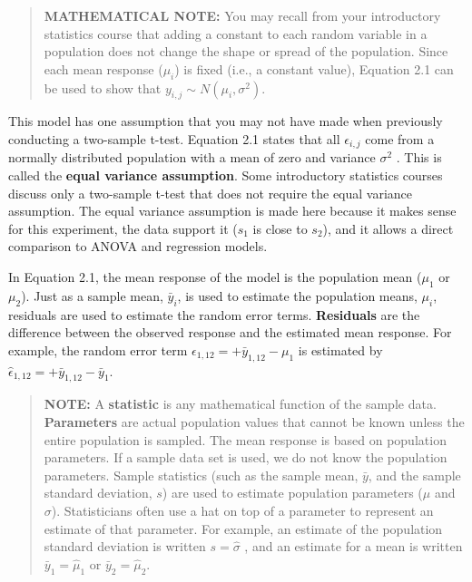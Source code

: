 \documentclass[
]{report}
\begin{document}
\begin{quote}
\textbf{MATHEMATICAL NOTE:}
You may recall from your introductory statistics course that adding a constant to each random variable in a population does not change the shape or spread of the population. Since each mean response (\(\scriptstyle \mu_i\)) is fixed (i.e., a constant value), Equation 2.1 can be used to show that \(\scriptstyle y_{i, j} \sim N(\mu_i,\sigma^2)\).
\end{quote}

This model has one assumption that you may not have made when previously conducting a two-sample t-test. Equation 2.1 states that all \(\scriptstyle \epsilon_{i, j}\) come from a normally distributed population with a mean of zero and
variance \(\scriptstyle \sigma^2\) . This is called the \textbf{equal variance assumption}. Some introductory statistics courses discuss only a two-sample t-test that does not require the equal variance assumption. The equal variance assumption is
made here because it makes sense for this experiment, the data support it (\(\scriptstyle s_1\) is close to \(\scriptstyle s_2\)), and it allows a direct comparison to ANOVA and regression models.

In Equation 2.1, the mean response of the model is the population mean (\(\scriptstyle \mu_1\) or \(\scriptstyle \mu_2\)). Just as a sample mean, \(\scriptstyle \bar{y}_i\), is used to estimate the population means, \(\scriptstyle \mu_i\), residuals are used to estimate the random error terms. \textbf{Residuals} are the difference between the observed response and the estimated mean response. For example, the random error term \(\scriptstyle \epsilon_{1, 12} = + \bar{y}_{1, 12} - \mu_1\) is estimated by \(\scriptstyle \hat{\epsilon}_{1, 12} = + \bar{y}_{1, 12} - \bar{y}_1\).

\begin{quote}
\textbf{NOTE:}
A \textbf{statistic} is any mathematical function of the sample data. \textbf{Parameters} are actual population values that cannot be known unless the entire population is sampled. The mean response is based on population parameters. If a sample data set is used, we do not know the population parameters. Sample statistics (such as the sample mean, \(\scriptstyle \bar{y}\), and the sample standard deviation, \(\scriptstyle s\)) are used to estimate population parameters (\(\scriptstyle \mu\) and \(\scriptstyle \sigma\)). Statisticians often use a hat on top of a parameter to represent an estimate of that parameter. For example, an estimate of the population standard deviation is written \(\scriptstyle s = \hat{\sigma}\) , and an estimate for a mean is written \(\scriptstyle \bar{y}_1 = \hat{\mu}_1\) or \(\scriptstyle \bar{y}_2 = \hat{\mu}_2\).
\end{quote}
\end{document}
